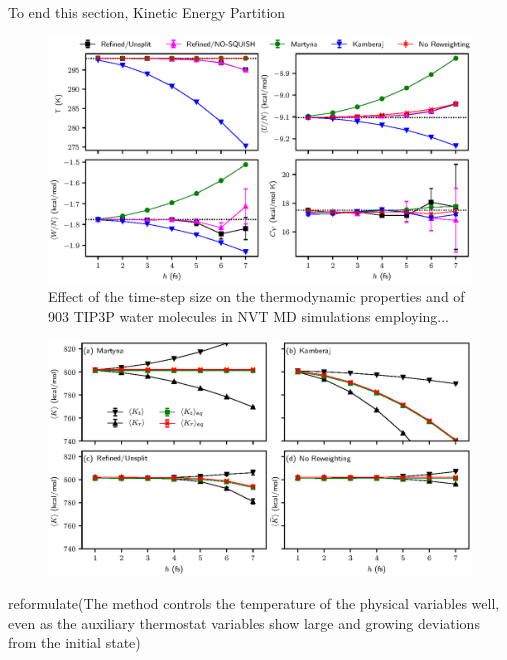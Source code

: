 \documentclass[
journal=jctcce,
layout=twocolumn
]{achemso}
\begin{document}
To end this section,  Kinetic Energy Partition

\begin{figure}
	\includegraphics{Figures/thermodynamic_properties.eps}
	\caption{Effect of the time-step size on the thermodynamic properties and of 903 TIP3P\cite{Jorgensen_1983} water molecules in NVT MD simulations employing...}
	\label{fig:properties}
\end{figure}

\begin{figure}
	\includegraphics{Figures/energy_partition.eps}
\end{figure}

reformulate(The method controls the temperature of the physical variables well, even as the auxiliary thermostat variables show large and growing deviations from the initial state)
\end{document}
